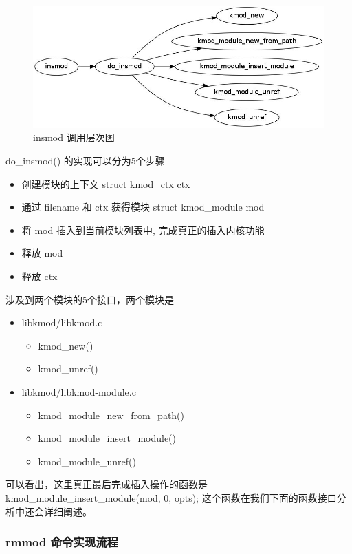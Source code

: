 \documentclass[11pt,a4paper]{article}
\makeatletter
\def\maxwidth{\ifdim\Gin@nat@width>\linewidth\linewidth
\else\Gin@nat@width\fi}
\let\Oldincludegraphics\includegraphics
\renewcommand{\includegraphics}[1]{\Oldincludegraphics[width=\maxwidth]{#1}}
\makeatother
\begin{document}
\begin{figure}[htbp]
\centering
\includegraphics{./figures/insmod.jpg}
\caption{insmod 调用层次图}
\end{figure}

do\_insmod() 的实现可以分为5个步骤

\begin{itemize}
\item
  创建模块的上下文 struct kmod\_ctx ctx
\item
  通过 filename 和 ctx 获得模块 struct kmod\_module mod
\item
  将 mod 插入到当前模块列表中, 完成真正的插入内核功能
\item
  释放 mod
\item
  释放 ctx
\end{itemize}
涉及到两个模块的5个接口，两个模块是

\begin{itemize}
\item
  libkmod/libkmod.c
  \begin{itemize}
  \item
    kmod\_new()
  \item
    kmod\_unref()
  \end{itemize}
\item
  libkmod/libkmod-module.c
  \begin{itemize}
  \item
    kmod\_module\_new\_from\_path()
  \item
    kmod\_module\_insert\_module()
  \item
    kmod\_module\_unref()
  \end{itemize}
\end{itemize}
可以看出，这里真正最后完成插入操作的函数是
kmod\_module\_insert\_module(mod, 0, opts);
这个函数在我们下面的函数接口分析中还会详细阐述。

\subsubsection{rmmod 命令实现流程}
\end{document}
